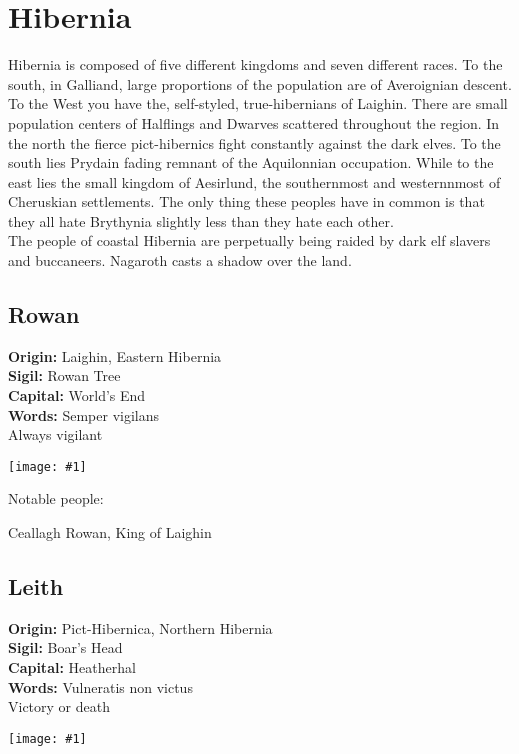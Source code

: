 \documentclass[a4paper]{dnd5}
\newcommand\inc[1]{
 \begin{center}\texttt{[image: \#1]}\end{center}
}
\newcommand\origin{\textbf{Origin: }}
\newcommand\sigil{\textbf{Sigil: }}
\newcommand\words{\textbf{Words: }}
\newcommand\wordsii{\hspace*{4em}}
\newcommand\capital{\textbf{Capital: }}
\begin{document}
\section*{Hibernia}

Hibernia is composed of five different kingdoms and seven different races.  To the south, in Galliand, large proportions of the population are of Averoignian descent.  To the West you have the, self-styled, true-hibernians of Laighin.  There are small population centers of Halflings and Dwarves scattered throughout the region.  In the north the fierce pict-hibernics fight constantly against the dark elves.  To the south lies Prydain fading remnant of the Aquilonnian occupation.  While to the east lies the small kingdom of Aesirlund, the southernmost and westernnmost of Cheruskian settlements.  The only thing these peoples have in common is that they all hate Brythynia slightly less than they hate each other.\\

The people of coastal Hibernia are perpetually being raided by dark elf slavers and buccaneers. Nagaroth casts a shadow over the land.

\subsection{Rowan}
\origin Laighin, Eastern Hibernia\\
\sigil Rowan Tree\\
\capital World's End\\
\words Semper vigilans\\
\wordsii Always vigilant\\
\inc{rowan.png}

Notable people:
\begin{description}
\item[Ceallagh Rowan, King of Laighin]
\end{description}

\subsection{Leith}
\origin Pict-Hibernica, Northern Hibernia\\
\sigil Boar's Head\\
\capital Heatherhal\\
\words Vulneratis non victus\\
\wordsii Victory or death\\
\inc{leith.png}
\end{document}
